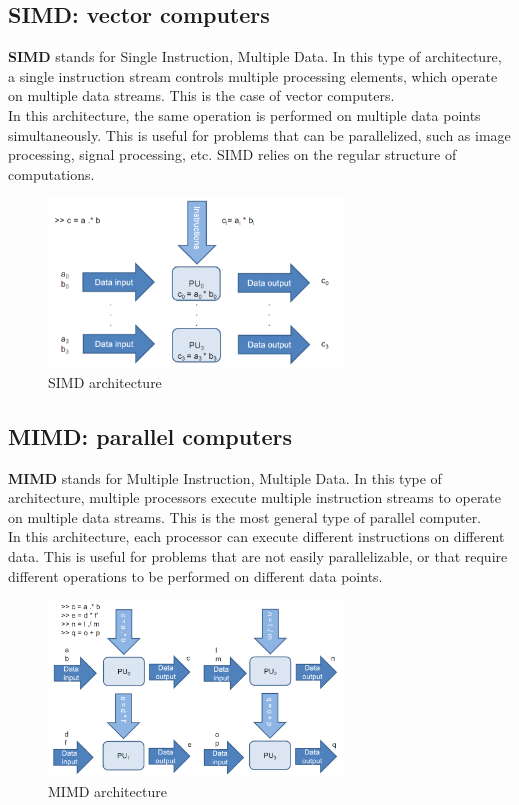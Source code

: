 \subsection{SIMD: vector computers}

\textbf{SIMD} stands for Single Instruction, Multiple Data. In this type of architecture,
a single instruction stream controls multiple processing elements, which operate on
multiple data streams. This is the case of vector computers.\\

In this architecture, the same operation is performed on multiple data points simultaneously.
This is useful for problems that can be parallelized, such as image processing, signal
processing, etc. SIMD relies on the regular structure of computations.

\begin{figure}[H]
    \centering
    \includegraphics[width=0.7\textwidth]{figures/simd.png}
    \caption{SIMD architecture}
    \label{fig:simd}
\end{figure}

\subsection{MIMD: parallel computers}

\textbf{MIMD} stands for Multiple Instruction, Multiple Data. In this type of architecture,
multiple processors execute multiple instruction streams to operate on multiple data streams.
This is the most general type of parallel computer.\\

In this architecture, each processor can execute different instructions on different data.
This is useful for problems that are not easily parallelizable, or that require different
operations to be performed on different data points. 

\begin{figure}[H]
    \centering
    \includegraphics[width=0.7\textwidth]{figures/mimd.png}
    \caption{MIMD architecture}
    \label{fig:mimd}
\end{figure}

